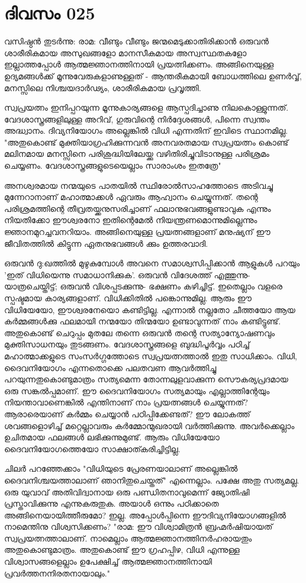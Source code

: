 \newpage
\section{ദിവസം 025}


വസിഷ്ഠന്‍ തുടര്‍ന്നു: രാമ: വീണ്ടും വീണ്ടും ജന്മമെടുക്കാതിരിക്കാന്‍ ഒരുവന്‍ ശാരീരികമായ അസുഖങ്ങളോ മാനസീകമായ അസ്വസ്ഥതകളോ ഇല്ലാത്തപ്പോള്‍ ആത്മജ്ഞാനത്തിനായി പ്രയത്നിക്കണം. അങ്ങിനെയുള്ള ഉദ്യമങ്ങള്‍ക്ക്‌ മൂന്നുവേരുകളാണുള്ളത്‌ - ആന്തരീകമായി ബോധത്തിലെ ഉണര്‍വ്വ്‌, മനസ്സിലെ നിശ്ചയദാര്‍ഢ്യം, ശാരീരികമായ പ്രവൃത്തി.

സ്വപ്രയത്നം ഇനിപ്പറയുന്ന മൂന്നുകാര്യങ്ങളെ ആസ്പദിച്ചാണു നിലകൊള്ളുന്നത്‌. വേദശാസ്ത്രങ്ങളിലുള്ള അറിവ്‌, ഗുരുവിന്റെ നിര്‍ദ്ദേശങ്ങള്‍, പിന്നെ സ്വന്തം അദ്ധ്വാനം. ദിവ്യനിയോഗം അല്ലെങ്കില്‍ വിധി എന്നതിന്‌ ഇവിടെ സ്ഥാനമില്ല. "അതുകൊണ്ട്‌ മുക്തിയാഗ്രഹിക്കുന്നവന്‍ അനവരതമായ സ്വപ്രയത്നം കൊണ്ട്‌ മലിനമായ മനസ്സിനെ പരിശുദ്ധിയിലേയ്ക്കു വഴിതിരിച്ചുവിടാനുള്ള പരിശ്രമം ചെയ്യണം. വേദശാസ്ത്രങ്ങളുടെയെല്ലാം സാരാംശം ഇതത്രേ" 

അനശ്വരമായ നന്മയുടെ പാതയില്‍ സ്ഥിരോല്‍സാഹത്തോടെ അടിവച്ചു മുന്നേറാനാണ്‌ മഹാത്മാക്കള്‍ ഏവരും ആഹ്വാനം ചെയ്യുന്നത്‌. തന്റെ പരിശ്രമത്തിന്റെ തീവ്രതയ്ക്കനുസരിച്ചാണ്‌ ഫലാനുഭവങ്ങളുണ്ടാവുക എന്നും നിയതിക്കോ ഈശ്വരനോ ഇതിന്റെമേല്‍ നിയന്ത്രണമൊന്നുമില്ലെന്നും ജ്ഞാനമുറച്ചവനറിയാം. അങ്ങിനെയുള്ള പ്രയത്നങ്ങളാണ്‌ മനുഷ്യന്‌ ഈ ജീവിതത്തില്‍ കിട്ടുന്ന ഏതനുഭവങ്ങള്‍ ക്കും ഉത്തരവാദി.

ഒരുവന്‍ ദു:ഖത്തില്‍ മുഴുകുമ്പോള്‍ അവനെ സമാശ്വസിപ്പിക്കാന്‍ ആളുകള്‍ പറയും 'ഇത്‌ വിധിയെന്നു സമാധാനിക്കുക'. ഒരുവന്‍ വിദേശത്ത്‌ എത്തുന്നു- യാത്രചെയ്തിട്ട്‌; ഒരുവന്‍ വിശപ്പടക്കുന്നു- ഭക്ഷണം കഴിച്ചിട്ട്‌. ഇതെല്ലാം വളരെ സ്പഷ്ടമായ കാര്യങ്ങളാണ്‌. വിധിക്കിതില്‍ പങ്കൊന്നുമില്ല. ആരും ഈ വിധിയേയോ, ഈശ്വരനേയൊ കണ്ടിട്ടില്ല. എന്നാല്‍ നല്ലതോ ചീത്തയോ ആയ കര്‍മ്മങ്ങള്‍ക്കു ഫലമായി നന്മയോ തിന്മയോ ഉണ്ടാവുന്നത്‌ നാം കണ്ടിട്ടുണ്ട്‌. അതുകൊണ്ട്‌ ചെറുപ്പം മുതലേ തന്നെ ഒരുവന്‍ തന്റെ സത്യാന്യോഷണവും മുക്തിസാധനയും തുടങ്ങണം. വേദശാസ്ത്രങ്ങളെ ബുദ്ധിപൂര്‍വ്വം പഠിച്ച്‌ മഹാത്മാക്കളുടെ സംസര്‍ഗ്ഗത്തോടെ സ്വപ്രയത്നത്താല്‍ ഇതു സാധിക്കാം. വിധി, ദൈവനിയോഗം എന്നതൊക്കെ പലതവണ ആവര്‍ത്തിച്ചു പറയുന്നതുകൊണ്ടുമാത്രം സത്യമെന്ന തോന്നലുളവാക്കുന്ന സൌകര്യപ്രദമായ ഒരു സങ്കല്‍പ്പമാണ്‌. ഈ ദൈവനിയോഗം സത്യമായും എല്ലാത്തിന്റേയും നിയന്താവാണെങ്കില്‍ എന്തിനാണ്‌ നാം പ്രയത്നങ്ങള്‍ ചെയ്യുന്നത്‌? ആരാരെയാണ്‌ കര്‍മ്മം ചെയ്യാന്‍ പഠിപ്പിക്കേണ്ടത്‌? ഈ ലോകത്ത്‌ ശവങ്ങളൊഴിച്ച്‌  മറ്റെല്ലാവരും കര്‍മ്മോന്മുഖരായി വര്‍ത്തിക്കുന്നു. അവര്‍ക്കെല്ലാം ഉചിതമായ ഫലങ്ങള്‍ ലഭിക്കുന്നുമുണ്ട്‌. ആരും വിധിയേയോ ദൈവനിയോഗത്തെയോ സാക്ഷാത്കരിച്ചിട്ടില്ല.

ചിലര്‍ പറഞ്ഞേക്കാം "വിധിയുടെ പ്രേരണയാലാണ്‌ അല്ലെങ്കില്‍ ദൈവനിശ്ചയത്താലാണ്‌ ഞാനിതുചെയ്തത്‌" എന്നെല്ലാം. പക്ഷേ അതു സത്യമല്ല. ഒരു യുവാവ്‌ അതിവിദ്വാനായ ഒരു പണ്ഡിതനാവുമെന്ന് ജ്യോതിഷി പ്രസ്താവിക്കുന്നു എന്നുകരുതുക. അയാള്‍ ഒന്നും പഠിക്കാതെ അങ്ങിനെയായിത്തീരുമോ? ഇല്ല. അപ്പോള്‍പ്പിന്നെ ഈദിവ്യനിയോഗങ്ങളില്‍ നാമെന്തിനു വിശ്വസിക്കണം? "രാമ: ഈ വിശ്വാമിത്രന്‍ ബ്രഹ്മര്‍ഷിയായത്‌ സ്വപ്രയത്നത്താലാണ്‌. നാമെല്ലാം ആത്മജ്ഞാനത്തിനര്‍ഹരായതും അതുകൊണ്ടുമാത്രം. അതുകൊണ്ട്‌ ഈ ഗ്രഹപ്പിഴ, വിധി എന്നുള്ള വിശ്വാസങ്ങളെല്ലാം ഉപേക്ഷിച്ച്‌ ആത്മജ്ഞാനത്തിനായി പ്രവര്‍ത്തനനിരതനായാലും."
